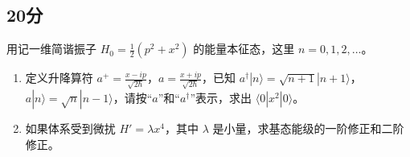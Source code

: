 \subsection{20分}
用记一维简谐振子 $H_0 = \frac{1}{2}(p^2 + x^2)$ 的能量本征态，这里 $n=0,1,2,\dots$。
\begin{enumerate}
    \item 定义升降算符 $a^+ = \frac{x - ip}{\sqrt{2\hbar}}$，$a = \frac{x + ip}{\sqrt{2\hbar}}$，已知 $a^\dagger |n\rangle = \sqrt{n+1}|n+1\rangle$，$a |n\rangle = \sqrt{n} |n-1\rangle$，请按“$a$”和“$a^\dagger$”表示，求出 $\langle 0|x^2|0\rangle$。
    
    \item 如果体系受到微扰 $H' = \lambda x^4$，其中 $\lambda$ 是小量，求基态能级的一阶修正和二阶修正。
\end{enumerate}